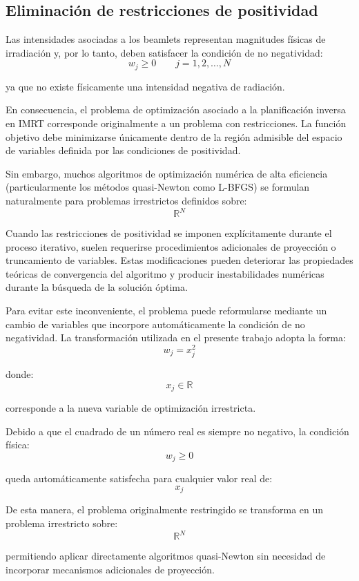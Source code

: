 \subsection{Eliminación de restricciones de positividad}

Las intensidades asociadas a los beamlets representan magnitudes físicas de irradiación y, por lo tanto, deben satisfacer la condición de no negatividad:
\[
w_j\geq0
\qquad
j=1,2,\dots,N
\]

ya que no existe físicamente una intensidad negativa de radiación.

En consecuencia, el problema de optimización asociado a la planificación inversa en IMRT corresponde originalmente a un problema con restricciones. La función objetivo debe minimizarse únicamente dentro de la región admisible del espacio de variables definida por las condiciones de positividad.

Sin embargo, muchos algoritmos de optimización numérica de alta eficiencia (particularmente los métodos quasi-Newton como L-BFGS) se formulan naturalmente para problemas irrestrictos definidos sobre:
\[
\mathbb{R}^N
\]

Cuando las restricciones de positividad se imponen explícitamente durante el proceso iterativo, suelen requerirse procedimientos adicionales de proyección o truncamiento de variables. Estas modificaciones pueden deteriorar las propiedades teóricas de convergencia del algoritmo y producir inestabilidades numéricas durante la búsqueda de la solución óptima.

Para evitar este inconveniente, el problema puede reformularse mediante un cambio de variables que incorpore automáticamente la condición de no negatividad. La transformación utilizada en el presente trabajo adopta la forma:
\[
w_j=x_j^2
\]

donde:
\[
x_j\in\mathbb{R}
\]

corresponde a la nueva variable de optimización irrestricta.

Debido a que el cuadrado de un número real es siempre no negativo, la condición física:
\[
w_j\geq0
\]

queda automáticamente satisfecha para cualquier valor real de:
\[
x_j
\]

De esta manera, el problema originalmente restringido se transforma en un problema irrestricto sobre:
\[
\mathbb{R}^N
\]

permitiendo aplicar directamente algoritmos quasi-Newton sin necesidad de incorporar mecanismos adicionales de proyección.

